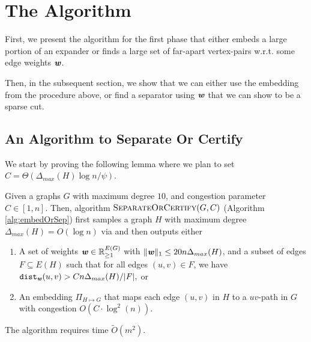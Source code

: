 \section{The Algorithm}

First, we present the algorithm for the first phase that either embeds a large portion of an expander or finds a large set of far-apart vertex-pairs w.r.t. some edge weights $\boldsymbol{\mathit{w}}$.

Then, in the subsequent section, we show that we can either use the embedding from the procedure above, or find a separator using $\boldsymbol{\mathit{w}}$ that we can show to be a sparse cut. 

\subsection{An Algorithm to Separate Or Certify}
\label{sec:seporcert}

We start by proving the following lemma where we plan to set $C = \Theta(\Delta_{max}(H) \log n/\psi)$. 

\begin{lemma}
\label{lemma:SeparateOrCertifyBalanced}
Given a graphs $G$ with maximum degree $10$, and congestion parameter $C \in [1, n]$. Then,  algorithm $\textsc{SeparateOrCertify}(G, C)$ (Algorithm \ref{alg:embedOrSep}) first samples a graph $H$ with maximum degree $\Delta_{max}(H) = O(\log n)$ via  and then outputs either
\begin{enumerate}
    \item A set of weights $\boldsymbol{{\mathit{w}}} \in \mathbb{R}_{\geq 1}^{E(G)}$ with $\|\boldsymbol{{\mathit{w}}}\|_1 \leq 20n \Delta_{max}(H)$,  and a subset of edges $F \subseteq E(H)$ such that 
    for all edges $(u,v) \in F$, we have $\operatorname{\mathtt{dist}}_{\boldsymbol{{\mathit{w}}}}(u,v) > {C n \Delta_{max}(H)}/{|F|},$ or
    \item An embedding $\Pi_{H \mapsto G}$ that maps each edge $(u,v)$ in $H$ to a $uv$-path in $G$ with congestion $O(C \cdot \log^2(n))$.
\end{enumerate}
The algorithm requires time $\tilde{O}(m^2)$.
\end{lemma}

